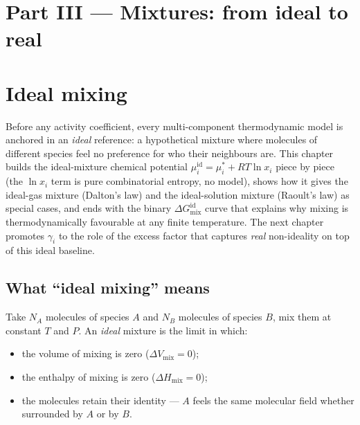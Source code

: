 \documentclass[11pt,a4paper]{article}
\begin{document}
\section*{Part III --- Mixtures: from ideal to real}
{}

\setcounter{section}{0}

\section{Ideal mixing}\label{ch:ideal-mixing}

\begin{whatyoulllearn}
Before any activity coefficient, every multi-component thermodynamic
model is anchored in an \emph{ideal} reference: a hypothetical
mixture where molecules of different species feel no preference for
who their neighbours are.  This chapter builds the ideal-mixture
chemical potential $\mu_i^{\mathrm{id}} = \mu_i^* + RT \ln x_i$
piece by piece (the $\ln x_i$ term is pure combinatorial entropy,
no model), shows how it gives the ideal-gas mixture (Dalton's law)
and the ideal-solution mixture (Raoult's law) as special cases, and
ends with the binary $\Delta G_{\mathrm{mix}}^{\mathrm{id}}$
curve that explains why mixing is thermodynamically favourable at
any finite temperature.  The next chapter promotes
$\gamma_i$ to the role of the excess factor that captures
\emph{real} non-ideality on top of this ideal baseline.
\end{whatyoulllearn}

\subsection{What ``ideal mixing'' means}

Take $N_A$ molecules of species $A$ and $N_B$ molecules of species
$B$, mix them at constant $T$ and $P$.  An \emph{ideal} mixture is
the limit in which:

\begin{itemize}[leftmargin=*,nosep]
  \item the volume of mixing is zero ($\Delta V_{\mathrm{mix}} = 0$);
  \item the enthalpy of mixing is zero ($\Delta H_{\mathrm{mix}} = 0$);
  \item the molecules retain their identity --- $A$ feels the same
        molecular field whether surrounded by $A$ or by $B$.
\end{itemize}
\end{document}

